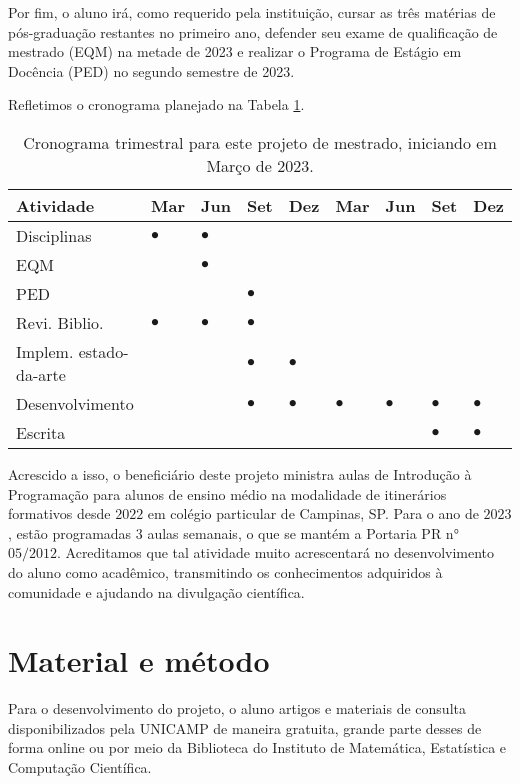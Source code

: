 \documentclass[11pt]{article}
\providecommand{\DIFaddtex}[1]{{\protect\color{blue}{#1}}} %
\providecommand{\DIFaddbegin}{} %
\providecommand{\DIFaddend}{} %
\providecommand{\DIFadd}[1]{\texorpdfstring{\DIFaddtex{#1}}{#1}} %
\newcommand{\DIFaddincludegraphics}[2][]{{\color{blue}\fbox{\DIFOincludegraphics[#1]{#2}}}} %
\DeclareRobustCommand{\DIFaddbegin}{\DIFOaddbegin \let\includegraphics\DIFaddincludegraphics} %
\DeclareRobustCommand{\DIFaddend}{\DIFOaddend \let\includegraphics\DIFOincludegraphics} %
\begin{document}
Por fim, o aluno irá, como requerido pela instituição, cursar as três matérias de pós-graduação restantes no primeiro ano, defender seu exame de qualificação de mestrado (EQM) na metade de 2023 e realizar o Programa de Estágio em Docência (PED) no segundo semestre de 2023.

Refletimos o cronograma planejado na Tabela \ref{tab:cron}.

\begin{table}[htbp]
\caption{\label{tab:cron}Cronograma trimestral para este projeto de mestrado, iniciando em Março de 2023.}
\centering
\begin{tabular}{lllllllll}
Atividade & Mar & Jun & Set & Dez & Mar & Jun & Set & Dez\\[0pt]
\hline
Disciplinas & \(\bullet\) & \(\bullet\) &  &  &  &  &  & \\[0pt]
EQM &  & \(\bullet\) &  &  &  &  &  & \\[0pt]
PED &  &  & \(\bullet\) &  &  &  &  & \\[0pt]
Revi. Biblio. & \(\bullet\) & \(\bullet\) & \(\bullet\) &  &  &  &  & \\[0pt]
Implem. estado-da-arte &  &  & \(\bullet\) & \(\bullet\) &  &  &  & \\[0pt]
Desenvolvimento &  &  & \(\bullet\) & \(\bullet\) & \(\bullet\) & \(\bullet\) & \(\bullet\) & \(\bullet\)\\[0pt]
Escrita &  &  &  &  &  &  & \(\bullet\) & \(\bullet\)\\[0pt]
\end{tabular}
\end{table}
Acrescido a isso, o beneficiário deste projeto ministra aulas de Introdução à Programação para alunos de ensino médio na modalidade de itinerários formativos desde \(2022\) em colégio particular de Campinas, SP.
Para o ano de \(2023\), estão programadas \(3\) aulas semanais, o que se mantém  \DIFaddbegin \DIFadd{consoante }\DIFaddend a Portaria PR n° \(05/2012\).
Acreditamos que tal atividade muito acrescentará no desenvolvimento do aluno como acadêmico, transmitindo os conhecimentos adquiridos à comunidade e ajudando na divulgação científica.

\section{Material e método}
 \DIFaddbegin \label{sec:orgd72aeb7}
\DIFaddend Para o desenvolvimento do projeto, o aluno  \DIFaddbegin \DIFadd{utilizará }\DIFaddend artigos e materiais de consulta disponibilizados pela UNICAMP de maneira gratuita, grande parte desses de forma online ou por meio da Biblioteca do Instituto de Matemática, Estatística e Computação Científica.
\end{document}
